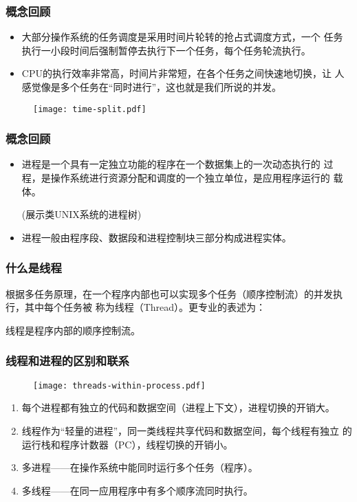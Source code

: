 \begin{frame}[fragile]
  \frametitle{概念回顾}

  
  \begin{itemize}
  \item 大部分操作系统的任务调度是采用{\hei\Red 时间片轮转的抢占式调度方式}，一个
    任务执行一小段时间后强制暂停去执行下一个任务，每个任务轮流执行。
  \item CPU的执行效率非常高，时间片非常短，在各个任务之间快速地切换，让
    人感觉像是多个任务在“同时进行”，这也就是我们所说的{\hei\Red 并发}。
  \end{itemize}

  \begin{figure}
    \centering
    \texttt{[image: time-split.pdf]}
  \end{figure}
\end{frame}

\begin{frame}[fragile]
  \frametitle{概念回顾}

  
  \begin{itemize}
  \item 进程是一个具有一定独立功能的程序在一个数据集上的一次动态执行的
    过程，是操作系统进行资源分配和调度的一个独立单位，是应用程序运行的
    载体。

    {\kai\Red (展示类UNIX系统的进程树)}
    
  \item 进程一般由{\hei\Blue 程序段、数据段和进程控制块}三部分构成进程实体。
  \end{itemize}
\end{frame}


\begin{frame}[fragile] %
  \frametitle{什么是线程}

  根据多任务原理，在一个程序内部也可以实现多个任务（顺序控制流）的并发执行，其中每个任务被
  称为{\hei\Red 线程（Thread）}。更专业的表述为：

  {\Blue\hei 线程是程序内部的顺序控制流。}
\end{frame}

\begin{frame}[fragile] %
  \frametitle{线程和进程的区别和联系}

  \begin{figure}
    \centering
    \texttt{[image: threads-within-process.pdf]}
  \end{figure}
  \pause
  \begin{enumerate}\small\kai
  \item 每个进程都有独立的代码和数据空间（进程上下文），进程切换的开销大。
  \item 线程作为“轻量的进程”，同一类线程共享代码和数据空间，每个线程有独立
    的运行栈和程序计数器（PC），线程切换的开销小。
  \item 多进程——在操作系统中能同时运行多个任务（程序）。
  \item 多线程——在同一应用程序中有多个顺序流同时执行。
  \end{enumerate}
\end{frame}

